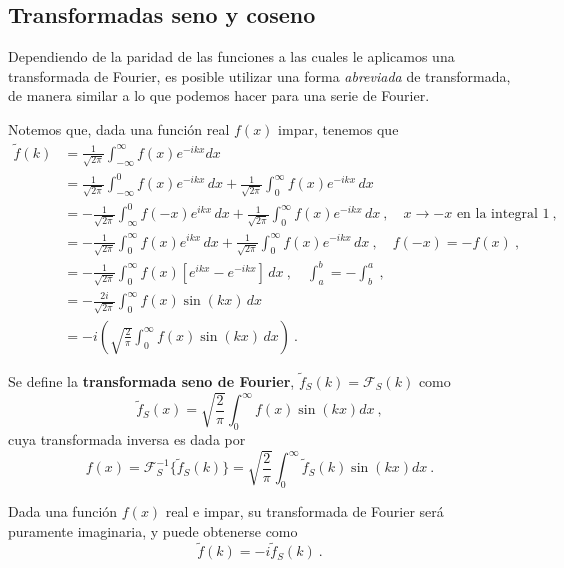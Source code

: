 \subsection{Transformadas seno y coseno}

Dependiendo de la paridad de las funciones a las cuales le aplicamos una transformada de Fourier, es posible utilizar una forma \emph{abreviada} de transformada, de manera similar a lo que podemos hacer para una serie de Fourier.

Notemos que, dada una función real $f(x)$ impar, tenemos que
\begin{align*}
    \tilde{f}(k) & = \frac{1}{\sqrt{2\pi}} \int_{-\infty}^{\infty} f(x) e^{-ikx} dx \\
    & = \frac{1}{\sqrt{2\pi}}  \int_{-\infty}^0 f(x) e^{-ikx} \,dx + \frac{1}{\sqrt{2\pi}} \int_{0}^{\infty} f(x) e^{-ikx} \, dx \\
    & = -\frac{1}{\sqrt{2\pi}}  \int_{\infty}^0 f(-x) e^{ikx} \,dx + \frac{1}{\sqrt{2\pi}}  \int_{0}^{\infty} f(x) e^{-ikx} \, dx \ , \quad x \to -x \mbox{ en la integral 1} \ , \\
    & = -\frac{1}{\sqrt{2\pi}} \int_{0}^{\infty} f(x) e^{ikx} \,dx + \frac{1}{\sqrt{2\pi}}  \int_{0}^{\infty} f(x) e^{-ikx} \, dx \ , \quad f(-x) = -f(x) \ ,  \\
     &= -\frac{1}{\sqrt{2\pi}}  \int_{0}^{\infty} f(x) [e^{ikx} - e^{-ikx}  ] \, dx \ , \quad \int_a^b = - \int_b^a \ , \\
    & = -\frac{2i}{\sqrt{2\pi}}  \int_{0}^{\infty} f(x) \sin(kx) \,dx \\
    & = -i \left(\sqrt{\frac{2}{\pi}}  \int_{0}^{\infty} f(x) \sin(kx) \,dx \right) \ .
\end{align*}

\begin{defi}
    Se define la \textbf{transformada seno de Fourier}, $\tilde{f}_S(k) = \mathcal{F}_S(k)$ como
    \begin{equation}
        \tilde{f}_S(x) = \sqrt{\frac{2}{\pi}} \int_0^\infty f(x) \sin(kx) dx \ ,
    \end{equation}
    cuya transformada inversa es dada por
    \begin{equation}
        f(x) = \mathcal{F}^{-1}_S\{\tilde{f}_S(k)\} = \sqrt{\frac{2}{\pi}} \int_0^\infty \tilde{f}_S(k) \sin(kx) dx \ .
    \end{equation}

    Dada una función $f(x)$ real e impar, su transformada de Fourier será puramente imaginaria, y puede obtenerse como
    \begin{equation*}
        \tilde{f}(k) = -i \tilde{f}_S(k) \ .
    \end{equation*}
\end{defi}

